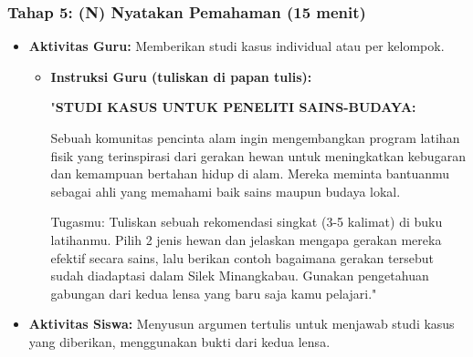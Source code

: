 \documentclass[a4paper,12pt]{article}
\begin{document}
\subsubsection{Tahap 5: (N) Nyatakan Pemahaman (15 menit)}
\begin{itemize}
\item \textbf{Aktivitas Guru:} Memberikan studi kasus individual atau per kelompok.
    \begin{itemize}
    \item \textbf{Instruksi Guru (tuliskan di papan tulis):}
    
    "\textbf{STUDI KASUS UNTUK PENELITI SAINS-BUDAYA:}
    
    Sebuah komunitas pencinta alam ingin mengembangkan program latihan fisik yang terinspirasi dari gerakan hewan untuk meningkatkan kebugaran dan kemampuan bertahan hidup di alam. Mereka meminta bantuanmu sebagai ahli yang memahami baik sains maupun budaya lokal.
    
    Tugasmu: Tuliskan sebuah rekomendasi singkat (3-5 kalimat) di buku latihanmu. Pilih 2 jenis hewan dan jelaskan mengapa gerakan mereka efektif secara sains, lalu berikan contoh bagaimana gerakan tersebut sudah diadaptasi dalam Silek Minangkabau. Gunakan pengetahuan gabungan dari kedua lensa yang baru saja kamu pelajari."
    \end{itemize}
\item \textbf{Aktivitas Siswa:} Menyusun argumen tertulis untuk menjawab studi kasus yang diberikan, menggunakan bukti dari kedua lensa.
\end{itemize}
\end{document}
